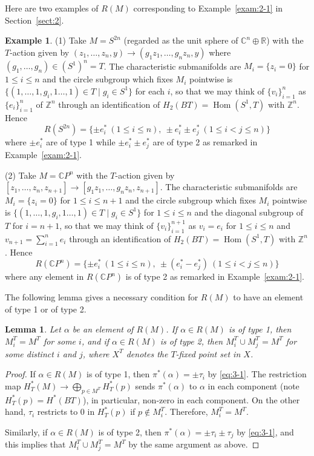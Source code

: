 \documentclass[12pt]{amsart}
\theoremstyle{plain} \numberwithin{equation}{section}
\newtheorem{lemm}[theo]{Lemma}
\theoremstyle{definition}
\newtheorem{exam}[theo]{Example}
\def\Z{\mathbb Z}
\def\C{\mathbb C}
\def\R{\mathbb R}
\DeclareMathOperator{\Hom}{Hom}
\begin{document}
Here are two examples of $R(M)$ corresponding to Example~\ref{exam:2-1} in Section~\ref{sect:2}.  

\begin{exam} \label{exam:3-1}
(1) Take $M=S^{2n}$ (regarded as the unit sphere of $\C^n\oplus\R$) with the $T$-action given by 
$(z_1,\dots,z_n,y)\to (g_1z_1,\dots,g_nz_n,y)$ 
where $(g_1,\dots,g_n)\in (S^1)^n=T$.  The characteristic submanifolds are $M_i=\{ z_i=0\}$ for $1\le i\le n$ and the circle subgroup which fixes $M_i$ pointwise is $\{(1,\dots,1,g_i,1\dots,1)\in T\mid g_i\in S^1\}$ for each $i$, so that we may think of $\{v_i\}_{i=1}^n$ as $\{e_i\}_{i=1}^n$ of $\Z^n$ through an identification of $H_2(BT)=\Hom(S^1,T)$ with $\Z^n$.  Hence 
\[
R(S^{2n})=\{\pm e_i^*\ (1\le i\le n),\ \pm e_i^*\pm e_j^*\ (1\le i<j\le n) \}
\]
where $\pm e_i^*$ are of type 1 while $\pm e_i^*\pm e_j^*$ are of type 2 as remarked in Example~\ref{exam:2-1}.

(2) Take $M=\C P^{n}$ with the $T$-action given by $[z_1,\dots,z_n,z_{n+1}]\to [g_1z_1,\dots,g_nz_n,z_{n+1}]$.  The characteristic submanifolds are $M_i=\{ z_i=0\}$ for $1\le i\le n+1$ and the circle subgroup which fixes $M_i$ pointwise is $\{(1,\dots,1,g_i,1\dots,1)\in T\mid g_i\in S^1\}$ for $1\le i\le n$ and the diagonal subgroup of $T$ for $i=n+1$, so that we may think of $\{v_i\}_{i=1}^{n+1}$ as $v_i=e_i$ for $1\le i\le n$ and $v_{n+1}=\sum_{i=1}^ne_i$ through an identification of $H_2(BT)=\Hom(S^1,T)$ with $\Z^n$. Hence 
\[
R(\C P^n)=\{\pm e_i^*\ (1\le i\le n),\ \pm(e_i^*-e_j^*) \ (1\le i<j\le n)\}
\]
where any element in $R(\C P^n)$ is of type 2 as remarked in Example~\ref{exam:2-1}.
\end{exam}

The following lemma gives a necessary condition for $R(M)$ to have an element of type 1 or of type 2.  

\begin{lemm} \label{lemm:3-2}
Let $\alpha$ be an element of $R(M)$.  If $\alpha\in R(M)$ is of type 1, then $M_i^T=M^T$ for some $i$, and if $\alpha\in R(M)$ is of type 2, then $M_i^T\cup M_j^T=M^T$ for some distinct $i$ and $j$, where $X^T$ denotes the $T$-fixed point set in $X$.  
\end{lemm} 

\begin{proof}
If $\alpha\in R(M)$ is of type 1, then $\pi^*(\alpha)=\pm\tau_{i}$ by \eqref{eq:3-1}.  The restriction map $H^*_T(M)\to \bigoplus_{p\in M^T}H_T^*(p)$ sends $\pi^*(\alpha)$ to $\alpha$ in each component (note $H^*_T(p)=H^*(BT)$), in particular, non-zero in each component.  On the other hand, $\tau_{i}$ restricts to $0$ in $H^*_T(p)$ if $p\notin M_i^T$.  Therefore, $M_i^T=M^T$.  

Similarly, if $\alpha\in R(M)$ is of type 2, then $\pi^*(\alpha)=\pm \tau_{i}\pm\tau_{j}$ by \eqref{eq:3-1}, and this implies that $M_i^T\cup M_j^T=M^T$ by the same argument as above.  
\end{proof}
\end{document}
